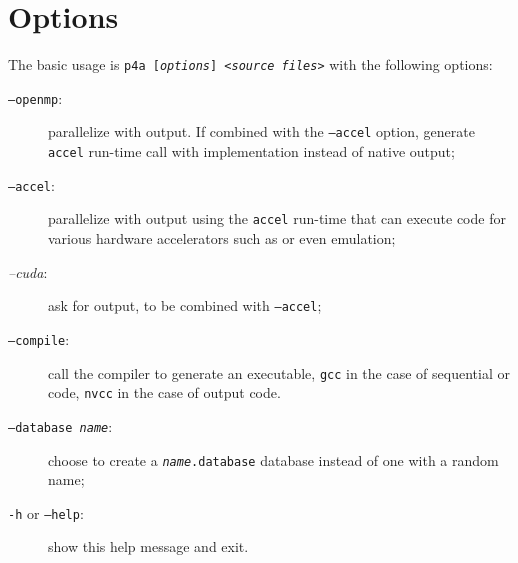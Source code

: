 \documentclass[a4paper]{article}
\begin{document}
\section{Options}
\label{sec:options}

The basic usage is \texttt{p4a [\emph{options}] <\emph{source files}>}
with the following options:
\begin{description}
\item[\texttt{--openmp}:] parallelize with \Aopenmp output. If combined
  with the \texttt{--accel} option, generate \Apfa \texttt{accel} run-time
  call with \Aopenmp implementation instead of native \Aopenmp output;

\item[\texttt{--accel}:] parallelize with output using the \Apfa
  \texttt{accel} run-time that can execute code for various
  hardware accelerators such as \Agpu or even \Aopenmp emulation;

\item[\emph{--cuda}:] ask for \Acuda output, to be combined with
  \texttt{--accel};

\item[\texttt{--compile}:] call the compiler to generate an executable,
  \texttt{gcc} in the case of sequential or \Aopenmp code, \texttt{nvcc}
  in the case of \Acuda output code.

\item[\texttt{--database \emph{name}}:] choose to create a
  \texttt{\emph{name}.database} database instead of one with a random name;

\item[\texttt{-h} or \texttt{--help}:] show this help message and exit.
\end{description}
\end{document}

